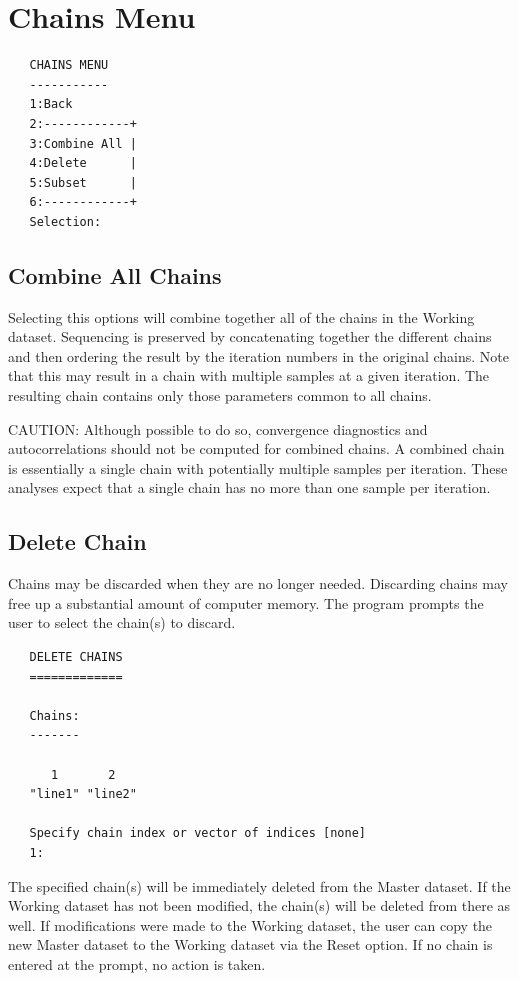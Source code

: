 \documentclass[12pt,letterpaper]{report}
\begin{document}
\section{Chains Menu}
\noindent

\vskip 9pt
\begin{tiny}
\begin{verbatim}
   CHAINS MENU
   -----------
   1:Back
   2:------------+
   3:Combine All |
   4:Delete      |
   5:Subset      |
   6:------------+
   Selection:
\end{verbatim}
\end{tiny}

\subsection{Combine All Chains}
\noindent
Selecting this options will combine together all of the chains in the Working
dataset. Sequencing is preserved by concatenating together the different chains
and then ordering the result by the iteration numbers in the original chains.
Note that this may result in a chain with multiple samples at a given iteration.
The resulting chain contains only those parameters common to all chains.

CAUTION: Although possible to do so, convergence diagnostics and
autocorrelations should not be computed for combined chains.  A combined chain
is essentially a single chain with potentially multiple samples per iteration.
These analyses expect that a single chain has no more than one sample per
iteration.

\subsection{Delete Chain}
\noindent
Chains may be discarded when they are no longer needed. Discarding chains may
free up a substantial amount of computer memory. The program prompts the user to
select the chain(s) to discard.
\vskip 9pt
\begin{tiny}
\begin{verbatim}
   DELETE CHAINS
   =============

   Chains:
   -------

      1       2
   "line1" "line2"

   Specify chain index or vector of indices [none]
   1:
\end{verbatim}
\end{tiny}
The specified chain(s) will be immediately deleted from the Master dataset. If
the Working dataset has not been modified, the chain(s) will be deleted from
there as well. If modifications were made to the Working dataset, the user can
copy the new Master dataset to the Working dataset via the Reset option. If no
chain is entered at the prompt, no action is taken.
\end{document}
